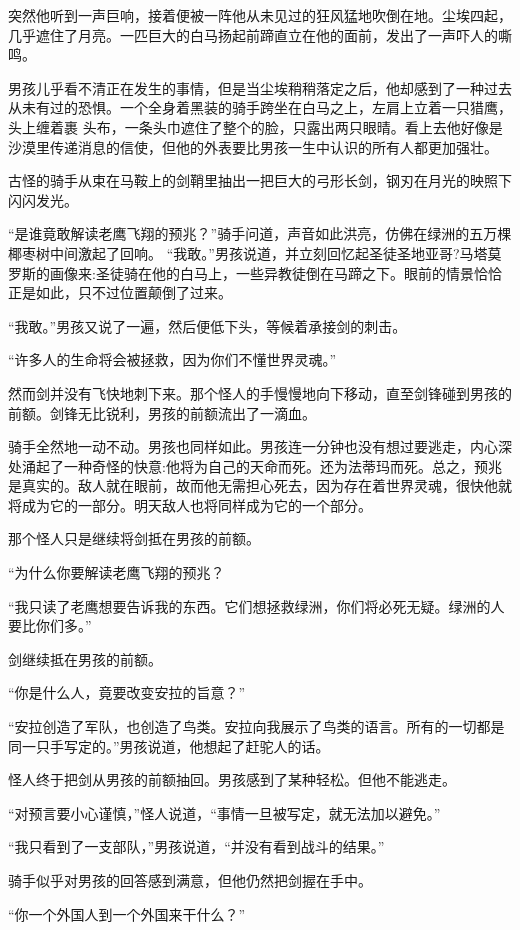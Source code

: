 \documentclass[twoside,openany]{book}
\begin{document}
突然他听到一声巨响，接着便被一阵他从未见过的狂风猛地吹倒在地。尘埃四起，几乎遮住了月亮。一匹巨大的白马扬起前蹄直立在他的面前，发出了一声吓人的嘶鸣。

男孩儿乎看不清正在发生的事情，但是当尘埃稍稍落定之后，他却感到了一种过去从未有过的恐惧。一个全身着黑装的骑手跨坐在白马之上，左肩上立着一只猎鹰，头上缠着裹 头布，一条头巾遮住了整个的脸，只露出两只眼晴。看上去他好像是沙漠里传递消息的信使，但他的外表要比男孩一生中认识的所有人都更加强壮。

古怪的骑手从束在马鞍上的剑鞘里抽出一把巨大的弓形长剑，钢刃在月光的映照下闪闪发光。

“是谁竟敢解读老鹰飞翔的预兆？”骑手问道，声音如此洪亮，仿佛在绿洲的五万棵椰枣树中间激起了回响。 “我敢。”男孩说道，并立刻回忆起圣徒圣地亚哥?马塔莫罗斯的画像来:圣徒骑在他的白马上，一些异教徒倒在马蹄之下。眼前的情景恰恰正是如此，只不过位置颠倒了过来。

“我敢。”男孩又说了一遍，然后便低下头，等候着承接剑的刺击。

“许多人的生命将会被拯救，因为你们不懂世界灵魂。”

然而剑并没有飞快地刺下来。那个怪人的手慢慢地向下移动，直至剑锋碰到男孩的前额。剑锋无比锐利，男孩的前额流出了一滴血。

骑手全然地一动不动。男孩也同样如此。男孩连一分钟也没有想过要逃走，内心深处涌起了一种奇怪的快意:他将为自己的天命而死。还为法蒂玛而死。总之，预兆是真实的。敌人就在眼前，故而他无需担心死去，因为存在着世界灵魂，很快他就将成为它的一部分。明天敌人也将同样成为它的一个部分。

那个怪人只是继续将剑抵在男孩的前额。

“为什么你要解读老鹰飞翔的预兆？

“我只读了老鹰想要告诉我的东西。它们想拯救绿洲，你们将必死无疑。绿洲的人要比你们多。”

剑继续抵在男孩的前额。

“你是什么人，竟要改变安拉的旨意？”

“安拉创造了军队，也创造了鸟类。安拉向我展示了鸟类的语言。所有的一切都是同一只手写定的。”男孩说道，他想起了赶驼人的话。

怪人终于把剑从男孩的前额抽回。男孩感到了某种轻松。但他不能逃走。

“对预言要小心谨慎，”怪人说道，“事情一旦被写定，就无法加以避免。”

“我只看到了一支部队，”男孩说道，“并没有看到战斗的结果。”

骑手似乎对男孩的回答感到满意，但他仍然把剑握在手中。

“你一个外国人到一个外国来干什么？”
\end{document}
